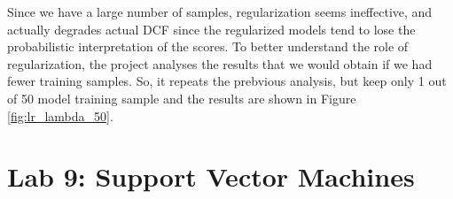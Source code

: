 \documentclass{article}
\begin{document}
Since we have a large number of samples, regularization seems ineffective, and actually degrades actual DCF since the regularized models tend to lose the probabilistic interpretation of the scores. To better understand the role of regularization, the project analyses the results that we would obtain if we had fewer training samples. So, it repeats the prebvious analysis, but keep only 1 out of 50 model training sample and the results are shown in Figure \ref{fig:lr_lambda_50}.

\section{Lab 9: Support Vector Machines}
\label{sec:svm}
\end{document}

